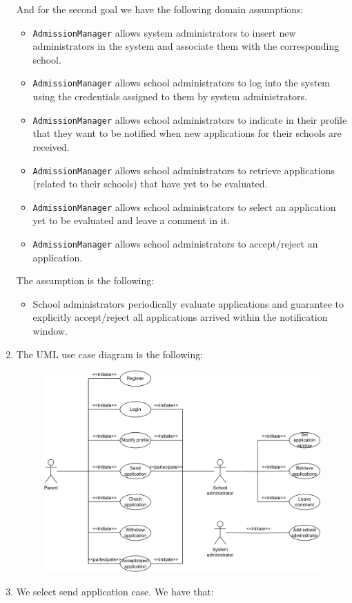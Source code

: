 \begin{enumerate}
        And for the second goal we have the following domain assumptions: 
        \begin{itemize}
            \item \texttt{AdmissionManager} allows system administrators to insert new administrators in the system and associate them with the corresponding school.
            \item \texttt{AdmissionManager} allows school administrators to log into the system using the credentials assigned to them by system administrators.
            \item \texttt{AdmissionManager} allows school administrators to indicate in their profile that they want to be notified when new applications for their schools are received.
            \item \texttt{AdmissionManager} allows school administrators to retrieve applications (related to their schools) that have yet to be evaluated.
            \item \texttt{AdmissionManager} allows school administrators to select an application yet to be evaluated and leave a comment in it. 
            \item \texttt{AdmissionManager} allows school administrators to accept/reject an application. 
        \end{itemize}
        The assumption is the following: 
        \begin{itemize}
            \item School administrators periodically evaluate applications and guarantee to explicitly accept/reject all applications arrived within the notification window.
        \end{itemize}
    \item The UML use case diagram is the following: 
        \begin{figure}[H]
            \centering
            \includegraphics[width=0.9\linewidth]{images/usecase.png}
        \end{figure}
    \item We select send application case. 
        We have that: 
\end{enumerate}
